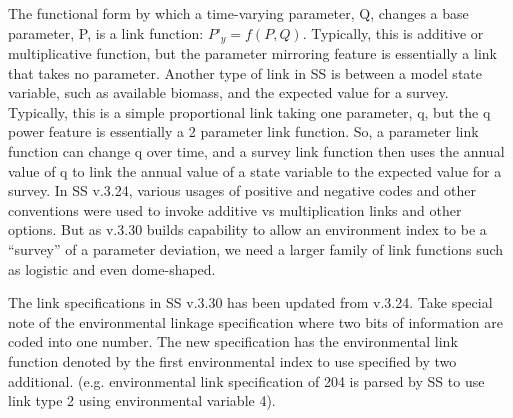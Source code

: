 The functional form by which a time-varying parameter, Q, changes a base parameter, P, is a link function:  $P’_y=f(P,Q)$.  Typically, this is additive or multiplicative function, but the parameter mirroring feature is essentially a link that takes no parameter.  Another type of link in SS is between a model state variable, such as available biomass, and the expected value for a survey.  Typically, this is a simple proportional link taking one parameter, q, but the q power feature is essentially a 2 parameter link function.  So, a parameter link function can change q over time, and a survey link function then uses the annual value of q to link the annual value of a state variable to the expected value for a survey.  In SS v.3.24, various usages of positive and negative codes and other conventions were used to invoke additive vs multiplication links and other options.  But as v.3.30 builds capability to allow an environment index to be a “survey” of a parameter deviation, we need a larger family of link functions such as logistic and even dome-shaped.

The link specifications in SS v.3.30 has been updated from v.3.24.  Take special note of the environmental linkage specification where two bits of information are coded into one number.  The new specification has the environmental link function denoted by the first environmental index to use specified by two additional. (e.g. environmental link specification of 204 is parsed by SS to use link type 2 using environmental variable 4).

